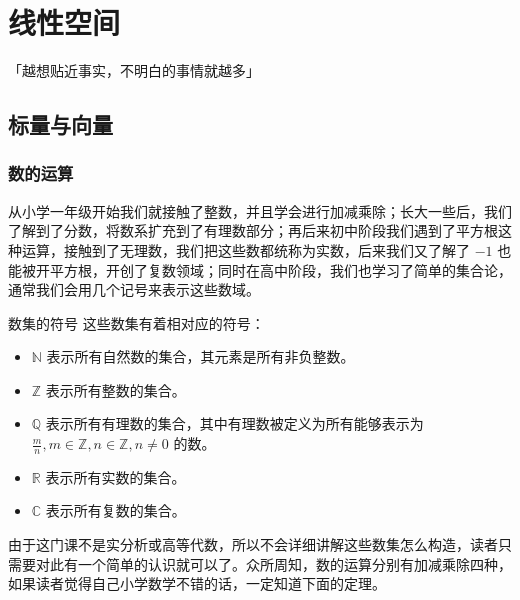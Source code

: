 \chapter{线性空间}
\begin{center}
	「越想贴近事实，不明白的事情就越多」
\end{center}
\vspace{-5pt}
\begin{center}
\end{center}

\section{标量与向量}

\subsection{数的运算}

从小学一年级开始我们就接触了整数，并且学会进行加减乘除；长大一些后，我们了解到了分数，将数系扩充到了有理数部分；再后来初中阶段我们遇到了平方根这种运算，接触到了无理数，我们把这些数都统称为实数，后来我们又了解了 $-1$ 也能被开平方根，开创了复数领域；同时在高中阶段，我们也学习了简单的集合论，通常我们会用几个记号来表示这些数域。

\begin{definition}{数集的符号}
	这些数集有着相对应的符号：
	\begin{itemize}
		\item $\mathbb{N}$ 表示所有自然数的集合，其元素是所有非负整数。
		\item $\mathbb{Z}$ 表示所有整数的集合。
		\item $\mathbb{Q}$ 表示所有有理数的集合，其中有理数被定义为所有能够表示为 $\frac{m}{n},m\in \mathbb{Z},n\in \mathbb{Z},n\neq0$ 的数。
		\item $\mathbb{R}$ 表示所有实数的集合。
		\item $\mathbb{C}$ 表示所有复数的集合。
	\end{itemize}
\end{definition}

由于这门课不是实分析或高等代数，所以不会详细讲解这些数集怎么构造，读者只需要对此有一个简单的认识就可以了。众所周知，数的运算分别有加减乘除四种，如果读者觉得自己小学数学不错的话，一定知道下面的定理。

